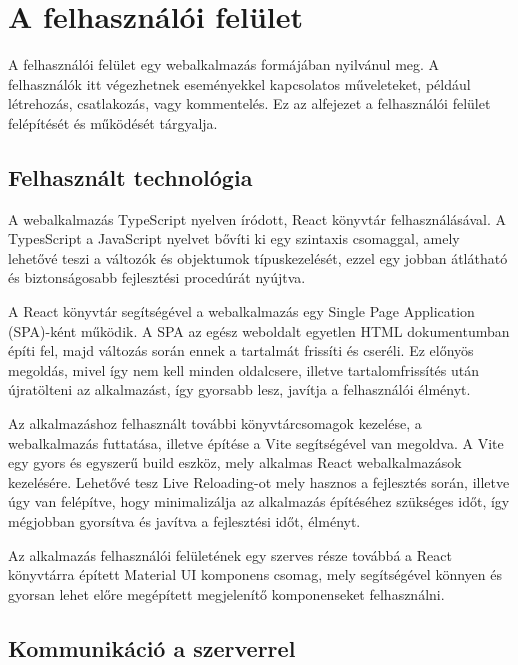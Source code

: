 \section{A felhasználói felület}

A felhasználói felület egy webalkalmazás formájában nyilvánul meg. A felhasználók itt végezhetnek eseményekkel kapcsolatos műveleteket, például létrehozás, csatlakozás, vagy kommentelés. Ez az alfejezet a felhasználói felület felépítését és működését tárgyalja.

\subsection{Felhasznált technológia}

A webalkalmazás TypeScript\cite{typescriptdocs} nyelven íródott, React\cite{reactdocs} könyvtár felhasználásával.
A TypesScript a JavaScript\cite{javascriptdocsmozilla} nyelvet bővíti ki egy szintaxis csomaggal, amely lehetővé teszi a változók és objektumok típuskezelését, ezzel egy jobban átlátható és biztonságosabb fejlesztési procedúrát nyújtva.

A React könyvtár segítségével a webalkalmazás egy Single Page Application (SPA)-ként\cite{singlepageapplicationdocs} működik.
A SPA az egész weboldalt egyetlen HTML dokumentumban építi fel, majd változás során ennek a tartalmát frissíti és cseréli. Ez előnyös megoldás, mivel így nem kell minden oldalcsere, illetve tartalomfrissítés után újratölteni az alkalmazást, így gyorsabb lesz, javítja a felhasználói élményt.

Az alkalmazáshoz felhasznált további könyvtárcsomagok kezelése, a webalkalmazás futtatása, illetve építése a Vite\cite{vitedocs} segítségével van megoldva.
A Vite egy gyors és egyszerű build eszköz, mely alkalmas React webalkalmazások kezelésére. Lehetővé tesz Live Reloading-ot mely hasznos a fejlesztés során, illetve úgy van felépítve, hogy minimalizálja az alkalmazás építéséhez szükséges időt, így mégjobban gyorsítva és javítva a fejlesztési időt, élményt.

Az alkalmazás felhasználói felületének egy szerves része továbbá a React könyvtárra épített Material UI komponens csomag, mely segítségével könnyen és gyorsan lehet előre megépített megjelenítő komponenseket felhasználni.

\subsection{Kommunikáció a szerverrel}


